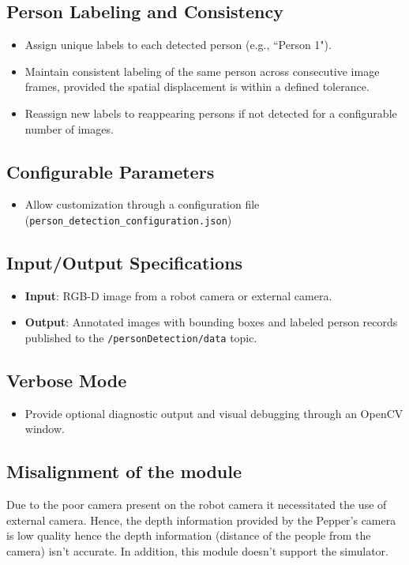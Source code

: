 \documentclass{CSSRforAfrica}
\begin{document}
\subsection*{Person Labeling and Consistency}
\begin{itemize}
	\item Assign unique labels to each detected person (e.g., ``Person 1").
	\item Maintain consistent labeling of the same person across consecutive image frames, provided the spatial displacement is within a defined tolerance.
	\item Reassign new labels to reappearing persons if not detected for a configurable number of images.
\end{itemize}

\subsection*{Configurable Parameters}
\begin{itemize}
	\item Allow customization through a configuration file (\texttt{person\_detection\_configuration.json})
\end{itemize}

\subsection*{Input/Output Specifications}
\begin{itemize}
	\item \textbf{Input}: RGB-D image from a robot camera or external camera.
	\item \textbf{Output}: Annotated images with bounding boxes and labeled person records published to the \texttt{/personDetection/data} topic.
\end{itemize}

\subsection*{Verbose Mode}
\begin{itemize}
	\item Provide optional diagnostic output and visual debugging through an OpenCV window.
\end{itemize}

\subsection*{Misalignment of the module}
Due to the poor camera present on the robot camera it necessitated the use of external camera. Hence, the depth information provided by the Pepper's camera is low quality hence the depth information (distance of the people from the camera) isn't accurate. In addition, this module doesn't support the simulator. 
\end{document}
